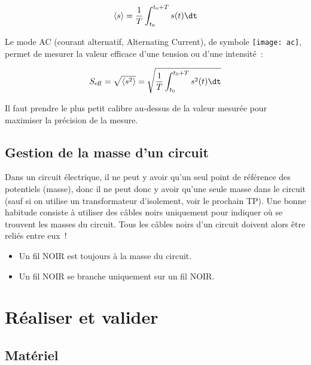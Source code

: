 \documentclass[a4paper, 11pt, final, garamond]{book}
\begin{document}
\begin{equation*}
    \left\langle s \right\rangle = \frac{1}{T} \int_{t_0}^{t_0+T} s(t) \dt
\end{equation*}

Le mode AC (courant alternatif, Alternating Current), de symbole
\texttt{[image: ac]}, permet de mesurer la valeur efficace d’une
tension ou d’une intensité~:

\begin{equation*}
    S_{\rm eff} = \sqrt{ \left\langle s^2 \right\rangle} = \sqrt{\frac{1}{T}
    \int_{t_0}^{t_0+T} s^2(t) \dt}
\end{equation*}


Il faut prendre le plus petit calibre au-dessus de la valeur mesurée pour
maximiser la précision de la mesure.

\subsection{Gestion de la masse d'un circuit}

Dans un circuit électrique, il ne peut y avoir qu’un seul point de référence des
potentiels (masse), donc il ne peut donc y avoir qu’une seule masse dans le
circuit (sauf si on utilise un transformateur d’isolement, voir le prochain TP).
Une bonne habitude consiste à utiliser des câbles noirs uniquement pour indiquer
où se trouvent les masses du circuit. Tous les câbles noirs d’un circuit doivent
alors être reliés entre eux~!

\begin{itemize}
    \item Un fil NOIR est toujours à la masse du circuit.
    \item Un fil NOIR se branche uniquement sur un fil NOIR.
\end{itemize}

\section{Réaliser et valider}
\subsection{Matériel}
\end{document}
